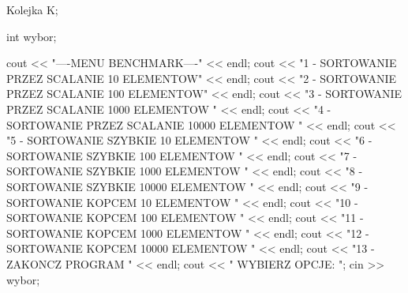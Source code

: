 \begin{DoxyCode}
{
        Kolejka K;
        
        int wybor;

        cout << "----MENU BENCHMARK----" << endl;
        cout << "1 - SORTOWANIE PRZEZ SCALANIE 10 ELEMENTOW" << endl;
        cout << "2 - SORTOWANIE PRZEZ SCALANIE 100 ELEMENTOW" << endl;
        cout << "3 - SORTOWANIE PRZEZ SCALANIE 1000 ELEMENTOW " << endl;
        cout << "4 - SORTOWANIE PRZEZ SCALANIE 10000 ELEMENTOW " << endl;
        cout << "5 - SORTOWANIE SZYBKIE 10 ELEMENTOW " << endl;
        cout << "6 - SORTOWANIE SZYBKIE 100 ELEMENTOW " << endl;
        cout << "7 - SORTOWANIE SZYBKIE 1000 ELEMENTOW " << endl;
        cout << "8 - SORTOWANIE SZYBKIE 10000 ELEMENTOW " << endl;
        cout << "9 - SORTOWANIE KOPCEM 10 ELEMENTOW " << endl;
        cout << "10 - SORTOWANIE KOPCEM 100 ELEMENTOW " << endl;
        cout << "11 - SORTOWANIE KOPCEM 1000 ELEMENTOW " << endl;
        cout << "12 - SORTOWANIE KOPCEM 10000 ELEMENTOW " << endl;
        cout << "13 - ZAKONCZ PROGRAM " << endl;
        cout << " WYBIERZ OPCJE: ";
        cin >> wybor;

}
\end{DoxyCode}
